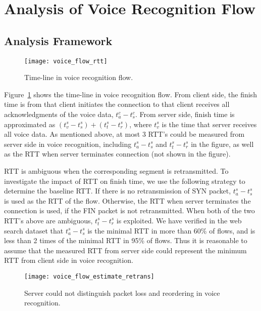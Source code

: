 
\section{Analysis of Voice Recognition Flow}

\subsection{Analysis Framework}

\begin{figure}[th]
\centering
	\texttt{[image: voice\_flow\_rtt]}
\caption{Time-line in voice recognition flow.}
\label{fig:voice_flow_rtt}
\end{figure}

Figure~\ref{fig:voice_flow_rtt} shows the time-line in voice recognition flow. From client side, the finish time is from that client initiates the connection to that client receives all acknowledgments of the voice data, \ie $t^c_a - t^c_s$. From server side, finish time is approximated as $(t^s_v - t^s_s) + (t^s_t - t^s_r)$, where $t^s_v$ is the time that server receives all voice data. As mentioned above, at most 3 RTT's could be measured from server side in voice recognition, including $t^s_a - t^s_s$ and $t^s_t - t^s_r$ in the figure, as well as the RTT when server terminates connection (not shown in the figure).

RTT is ambiguous when the corresponding segment is retransmitted. To investigate the impact of RTT on finish time, we use the following strategy to determine the baseline RTT. If there is no retransmission of SYN packet, $t^s_a - t^s_s$ is used as the RTT of the flow. Otherwise, the RTT when server terminates the connection is used, if the FIN packet is not retransmitted. When both of the two RTT's above are ambiguous, $t^s_t - t^s_r$ is exploited. We have verified in the web search dataset that $t^s_a - t^s_s$ is the minimal RTT in more than 60\% of flows, and is less than 2 times of the minimal RTT in 95\% of flows. Thus it is reasonable to assume that the measured RTT from server side could represent the minimum RTT from client side in voice recognition.

\begin{figure*}[th]
\centering
	\texttt{[image: voice\_flow\_estimate\_retrans]}
\caption{Server could not distinguish packet loss and reordering in voice recognition.}
\label{fig:voice_flow_estimate_retrans}
\end{figure*}

